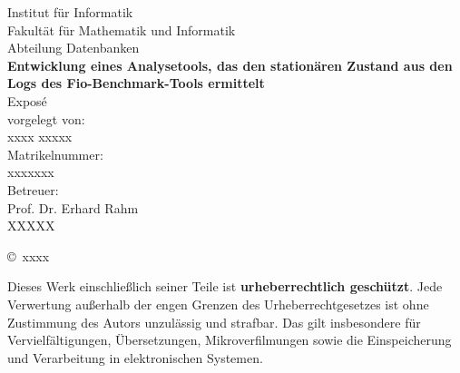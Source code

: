 \documentclass{article}
\newcommand{\titel}{Entwicklung eines Analysetools, das den stationären Zustand aus den Logs des Fio-Benchmark-Tools ermittelt}
\newcommand{\art}{Exposé} %
\newcommand{\fachgebiet}{Abteilung Datenbanken}
\newcommand{\fakultaet}{Fakultät für Mathematik und Informatik}
\newcommand{\institut}{Institut für Informatik}
\newcommand{\autor}{xxxx xxxxx}
\newcommand{\matrikelnr}{xxxxxxx}
\newcommand{\erstbetreuer}{Prof. Dr. Erhard Rahm}
\newcommand{\zweitbetreuer}{XXXXX}
\newcommand{\jahr}{xxxx}
\begin{document}
\thispagestyle{plain}
\begin{titlepage}

\begin{center}

\institut\\
\fakultaet\\
\fachgebiet\\[6ex]

\textbf{\large\titel}\\[1.5ex]
\art\\[6ex]

\normalsize
vorgelegt von:\\
\autor\\[1.5ex]
Matrikelnummer:\\
\matrikelnr\\[1.5ex]
Betreuer:\\
\erstbetreuer\\
\zweitbetreuer\\[1.0ex]
\end{center}


\begin{center}
\copyright\ \jahr\\[1.0ex]
\end{center}

\singlespacing
\small
\noindent Dieses Werk einschließlich seiner Teile ist \textbf{urheberrechtlich geschützt}. Jede Verwertung außerhalb der engen Grenzen des Urheberrechtgesetzes ist ohne Zustimmung des Autors unzulässig und strafbar. Das gilt insbesondere für Vervielfältigungen, Übersetzungen, Mikroverfilmungen sowie die Einspeicherung und Verarbeitung in elektronischen Systemen.



\end{titlepage}


\tableofcontents{}


\newpage

\begin{abstract}
Mit Benchmarks kann man die Performance von Computersystemen, wie etwa die Rechenleistung und die I/O-Geschwindigkeit, messen. Diese Messungen können stark oder schwach schwanken, je nachdem, ob der Rechner gerade erst mit den Messungen begonnen hat oder schon länger läuft. In dieser Arbeit wird mit dem Benchmark-Tool Fio gearbeitet, und es wird ein Analysetool entwickelt, das den Zustand ermittelt, in dem die Schwankungen der Messungen am geringsten sind. Dabei wird statistische Analyse angewendet, um diesen Zustand zu bestimmen. Das Progarmm wird in Java geschrieben.

\end{abstract}
\end{document}
